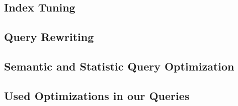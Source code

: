 \subsection{Index Tuning}



\subsection{Query Rewriting}


\subsection{Semantic and Statistic Query Optimization}



\subsection{Used Optimizations in our Queries}



